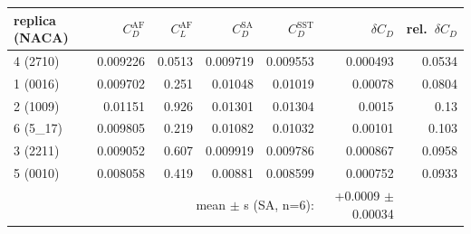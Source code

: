 \caption{Solver offset: six AirfRANS test simulations re-solved in Fluent (SA, grid level L2). $\delta C_D = C_D^{\mathrm{Fluent}} - C_D^{\mathrm{AirfRANS}}$; every replica reads high, so the mean offset $\bar{\delta}_{C_D}$ is subtracted before any surrogate comparison.}
\label{tab:fluent_offset}
\providecommand{\tblfont}{\footnotesize}%
\tblfont
\setlength{\tabcolsep}{4pt}
\begin{tabular}{lrrrrrr}
\toprule
replica (NACA) & $C_D^{\mathrm{AF}}$ & $C_L^{\mathrm{AF}}$ & $C_D^{\mathrm{SA}}$ & $C_D^{\mathrm{SST}}$ & $\delta C_D$ & rel.\ $\delta C_D$ \\
\midrule
4 (2710) & 0.009226 & 0.0513 & 0.009719 & 0.009553 & 0.000493 & 0.0534 \\
1 (0016) & 0.009702 & 0.251 & 0.01048 & 0.01019 & 0.00078 & 0.0804 \\
2 (1009) & 0.01151 & 0.926 & 0.01301 & 0.01304 & 0.0015 & 0.13 \\
6 (5\_17) & 0.009805 & 0.219 & 0.01082 & 0.01032 & 0.00101 & 0.103 \\
3 (2211) & 0.009052 & 0.607 & 0.009919 & 0.009786 & 0.000867 & 0.0958 \\
5 (0010) & 0.008058 & 0.419 & 0.00881 & 0.008599 & 0.000752 & 0.0933 \\
\midrule
\multicolumn{5}{r}{mean $\pm$ s (SA, n=6):} & +0.0009 $\pm$ 0.00034 & \\
\bottomrule
\end{tabular}

